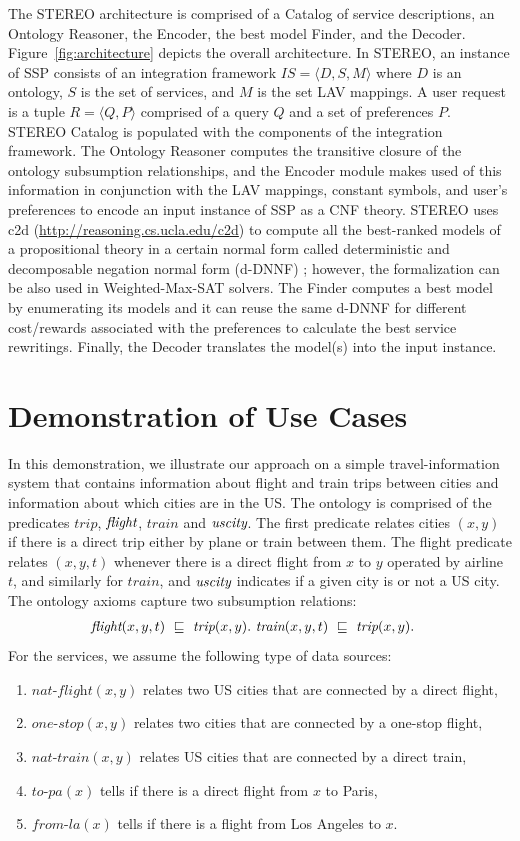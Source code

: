 \documentclass{llncs}
\newcommand{\tup}[1]{\langle #1 \rangle}
\newcommand{\orule}{\sqsubseteq}
\newcommand{\flight}{\text{\it flight}}
\newcommand{\UScity}{\text{\it uscity}}
\newcommand{\trip}{\textit{trip}}
\newcommand{\train}{\textit{train}}
\newcommand{\nationaltlight}{\textit{nat-flight}}
\newcommand{\nationaltrain}{\textit{nat-train}}
\newcommand{\onestop}{\textit{one-stop}}
\newcommand{\toPA}{\textit{to-pa}}
\newcommand{\fromLA}{\textit{from-la}}
\begin{document}
 The STEREO architecture  is comprised of a Catalog of service descriptions,
 an Ontology Reasoner, the Encoder, the best model Finder,
and the Decoder.
Figure~\ref{fig:architecture} depicts the overall architecture. In STEREO, an instance of SSP consists of an integration framework $IS=\tup{D,S,M}$ where $D$ is an ontology, $S$ is the set
of services, and $M$ is the set LAV mappings. A user request is a tuple $R=\tup{Q,P}$ comprised of a query $Q$  and a set of preferences $P$. STEREO Catalog is populated with the components of the integration framework. The Ontology Reasoner computes the transitive
closure of the ontology subsumption relationships, and the Encoder module makes used of this information in conjunction with the LAV mappings,  constant symbols,   and user's preferences to encode  an input instance of SSP as a CNF theory.
STEREO uses  c2d (\url{http://reasoning.cs.ucla.edu/c2d}) to compute all the
best-ranked models of a propositional theory  in a certain 
normal form called deterministic and decomposable negation normal
form (d-DNNF) \cite{darwiche:d-dnnfs}; however, the formalization can be also used in Weighted-Max-SAT solvers.
 The Finder computes a best model by enumerating its models  and it can reuse the same d-DNNF for different cost/rewards associated with the preferences to calculate  the best service rewritings. 
   Finally, the Decoder translates the model(s)  into the input instance.


\section{Demonstration of Use Cases}
In this demonstration, we illustrate our approach on  a simple travel-information system that contains information about
flight and train trips between cities and information about which cities
are in the US. The ontology is comprised of the predicates
$\trip$, $\flight$, $\train$ and $\UScity$.
The first predicate relates cities $(x,y)$ if there is a direct
trip either by plane or train between them. The flight predicate relates $(x,y,t)$ whenever there is a direct flight from $x$ to $y$ operated by airline $t$, and similarly for $\train$,
and $\UScity$ indicates if a given city is or not a US city. 
The ontology axioms capture two subsumption relations:
\begin{alignat*}{1}
\flight(x,y,t)\  \orule\ \trip(x,y).\  & \train(x,y,t)\  \orule\ \trip(x,y).
\end{alignat*}
For the services, we assume the following type of data sources:
\begin{enumerate}[--]
\item $\nationaltlight(x,y)$ relates two US cities that are connected by a direct flight,
\item $\onestop(x,y)$ relates two cities that are connected by a one-stop flight,
\item $\nationaltrain(x,y)$ relates US cities that are connected by a direct train,
\item $\toPA(x)$ tells if there is a direct flight from $x$ to Paris,
\item $\fromLA(x)$ tells if there is a flight from Los Angeles to $x$.
\end{enumerate}
\end{document}
